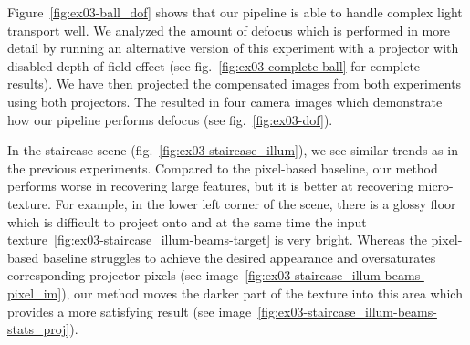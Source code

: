 Figure~\ref{fig:ex03-ball_dof} shows that our pipeline is able to handle complex light transport well. We analyzed the amount of defocus which is performed in more detail by running an alternative version of this experiment with a projector with disabled depth of field effect (see fig.~\ref{fig:ex03-complete-ball} for complete results). We have then projected the compensated images from both experiments using both projectors. The resulted in four camera images which demonstrate how our pipeline performs defocus (see fig.~\ref{fig:ex03-dof}).

In the staircase scene (fig.~\ref{fig:ex03-staircase_illum}), we see similar trends as in the previous experiments. Compared to the pixel-based baseline, our method performs worse in recovering large features, but it is better at recovering micro-texture. For example, in the lower left corner of the scene, there is a glossy floor which is difficult to project onto and at the same time the input texture~\ref{fig:ex03-staircase_illum-beams-target} is very bright. Whereas the pixel-based baseline struggles to achieve the desired appearance and oversaturates corresponding projector pixels (see image~\ref{fig:ex03-staircase_illum-beams-pixel_im}), our method moves the darker part of the texture into this area which provides a more satisfying result (see image~\ref{fig:ex03-staircase_illum-beams-stats_proj}).